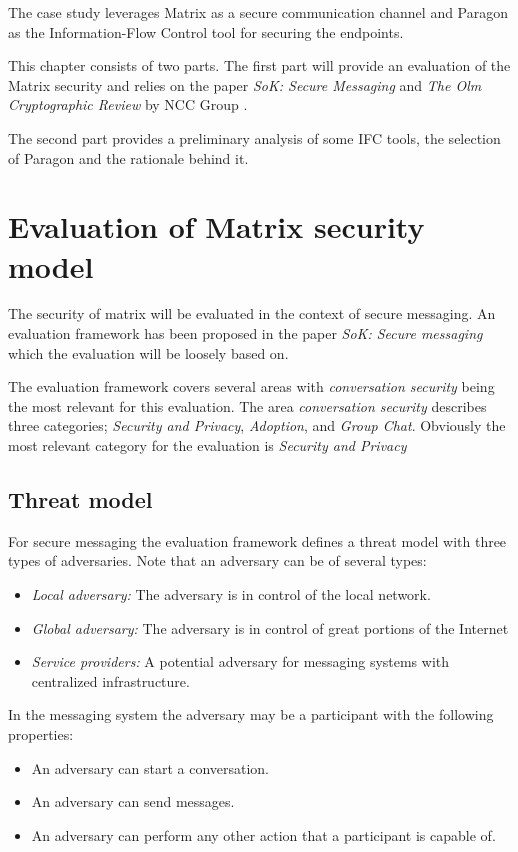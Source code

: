 The case study leverages Matrix as a secure communication channel and Paragon as the Information-Flow Control tool for securing the endpoints. 

This chapter consists of two parts. The first part will provide an evaluation of the Matrix security and relies on the paper \emph{SoK: Secure Messaging} \cite{sok} and \emph{The Olm Cryptographic Review} by NCC Group \cite{ncc}. 

The second part provides a preliminary analysis of some IFC tools, the selection of Paragon and the rationale behind it.


\section{Evaluation of Matrix security model}\label{evaluationofmatrix}
The security of matrix will be evaluated in the context of secure messaging. An evaluation framework has been proposed in the paper \emph{SoK: Secure messaging} which the evaluation will be loosely based on. 

The evaluation framework covers several areas with \emph{conversation security} being the most relevant for this evaluation. The area \emph{conversation security} describes three categories; \emph{Security and Privacy}, \emph{Adoption}, and \emph{Group Chat}. Obviously the most relevant category for the evaluation is \emph{Security and Privacy}

\subsection{Threat model}
For secure messaging the evaluation framework defines a threat model with three types of adversaries. Note that an adversary can be of several types:

\begin{itemize}
	\item \emph{Local adversary:} The adversary is in control of the local network.
	\item \emph{Global adversary:} The adversary is in control of great portions of the Internet 
	\item \emph{Service providers:} A potential adversary for messaging systems with centralized infrastructure.
\end{itemize}

In the messaging system the adversary may be a participant with the following properties:

\begin{itemize}
	\item An adversary can start a conversation.
	\item An adversary can send messages.
	\item An adversary can perform any other action that a participant is capable of.
\end{itemize}


